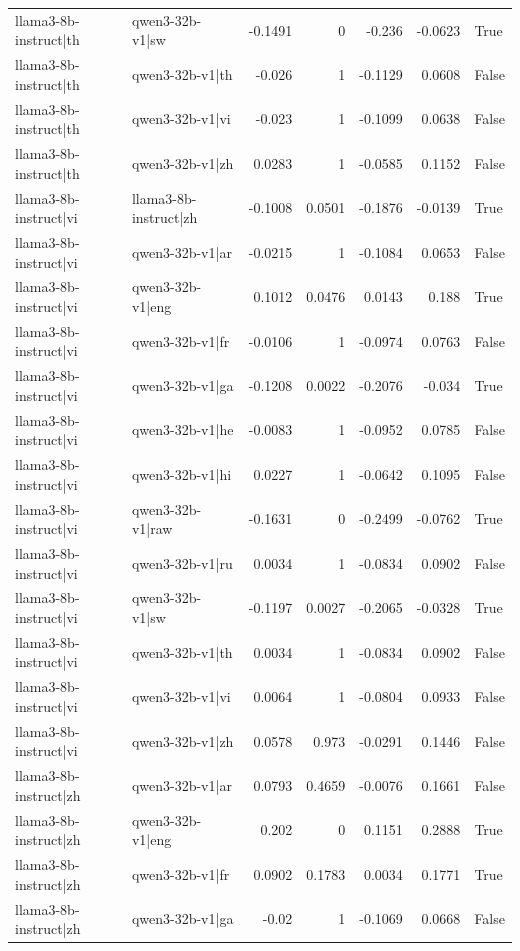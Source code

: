\begin{table}
\begin{tabular}{l l r r r r l}
llama3-8b-instruct|th & qwen3-32b-v1|sw & -0.1491 & 0 & -0.236 & -0.0623 & True \\
llama3-8b-instruct|th & qwen3-32b-v1|th & -0.026 & 1 & -0.1129 & 0.0608 & False \\
llama3-8b-instruct|th & qwen3-32b-v1|vi & -0.023 & 1 & -0.1099 & 0.0638 & False \\
llama3-8b-instruct|th & qwen3-32b-v1|zh & 0.0283 & 1 & -0.0585 & 0.1152 & False \\
llama3-8b-instruct|vi & llama3-8b-instruct|zh & -0.1008 & 0.0501 & -0.1876 & -0.0139 & True \\
llama3-8b-instruct|vi & qwen3-32b-v1|ar & -0.0215 & 1 & -0.1084 & 0.0653 & False \\
llama3-8b-instruct|vi & qwen3-32b-v1|eng & 0.1012 & 0.0476 & 0.0143 & 0.188 & True \\
llama3-8b-instruct|vi & qwen3-32b-v1|fr & -0.0106 & 1 & -0.0974 & 0.0763 & False \\
llama3-8b-instruct|vi & qwen3-32b-v1|ga & -0.1208 & 0.0022 & -0.2076 & -0.034 & True \\
llama3-8b-instruct|vi & qwen3-32b-v1|he & -0.0083 & 1 & -0.0952 & 0.0785 & False \\
llama3-8b-instruct|vi & qwen3-32b-v1|hi & 0.0227 & 1 & -0.0642 & 0.1095 & False \\
llama3-8b-instruct|vi & qwen3-32b-v1|raw & -0.1631 & 0 & -0.2499 & -0.0762 & True \\
llama3-8b-instruct|vi & qwen3-32b-v1|ru & 0.0034 & 1 & -0.0834 & 0.0902 & False \\
llama3-8b-instruct|vi & qwen3-32b-v1|sw & -0.1197 & 0.0027 & -0.2065 & -0.0328 & True \\
llama3-8b-instruct|vi & qwen3-32b-v1|th & 0.0034 & 1 & -0.0834 & 0.0902 & False \\
llama3-8b-instruct|vi & qwen3-32b-v1|vi & 0.0064 & 1 & -0.0804 & 0.0933 & False \\
llama3-8b-instruct|vi & qwen3-32b-v1|zh & 0.0578 & 0.973 & -0.0291 & 0.1446 & False \\
llama3-8b-instruct|zh & qwen3-32b-v1|ar & 0.0793 & 0.4659 & -0.0076 & 0.1661 & False \\
llama3-8b-instruct|zh & qwen3-32b-v1|eng & 0.202 & 0 & 0.1151 & 0.2888 & True \\
llama3-8b-instruct|zh & qwen3-32b-v1|fr & 0.0902 & 0.1783 & 0.0034 & 0.1771 & True \\
llama3-8b-instruct|zh & qwen3-32b-v1|ga & -0.02 & 1 & -0.1069 & 0.0668 & False \\

\end{tabular}
\end{table}
